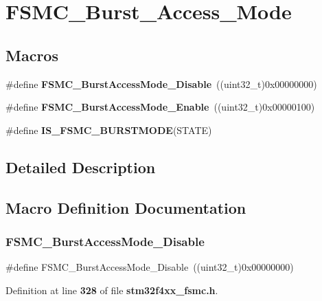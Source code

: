 \section{F\+S\+M\+C\+\_\+\+Burst\+\_\+\+Access\+\_\+\+Mode}
\label{group__FSMC__Burst__Access__Mode}
\subsection*{Macros}
\begin{DoxyCompactItemize}
\item 
\#define \textbf{ F\+S\+M\+C\+\_\+\+Burst\+Access\+Mode\+\_\+\+Disable}~((uint32\+\_\+t)0x00000000)
\item 
\#define \textbf{ F\+S\+M\+C\+\_\+\+Burst\+Access\+Mode\+\_\+\+Enable}~((uint32\+\_\+t)0x00000100)
\item 
\#define \textbf{ I\+S\+\_\+\+F\+S\+M\+C\+\_\+\+B\+U\+R\+S\+T\+M\+O\+DE}(S\+T\+A\+TE)
\end{DoxyCompactItemize}


\subsection{Detailed Description}


\subsection{Macro Definition Documentation}
\mbox{\label{group__FSMC__Burst__Access__Mode_ga26fc544945415e350563a9b00684850c}} 
\subsubsection{F\+S\+M\+C\+\_\+\+Burst\+Access\+Mode\+\_\+\+Disable}
{\footnotesize\ttfamily \#define F\+S\+M\+C\+\_\+\+Burst\+Access\+Mode\+\_\+\+Disable~((uint32\+\_\+t)0x00000000)}



Definition at line \textbf{ 328} of file \textbf{ stm32f4xx\+\_\+fsmc.\+h}.

